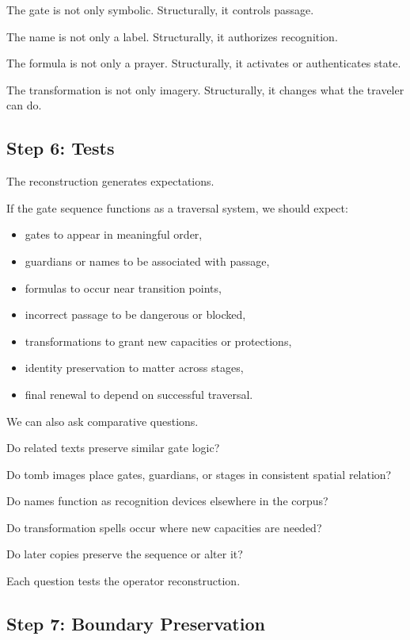 \documentclass[11pt]{book}
\begin{document}
The gate is not only symbolic. Structurally, it controls passage.

The name is not only a label. Structurally, it authorizes recognition.

The formula is not only a prayer. Structurally, it activates or authenticates state.

The transformation is not only imagery. Structurally, it changes what the traveler can do.

\subsection{Step 6: Tests}

The reconstruction generates expectations.

If the gate sequence functions as a traversal system, we should expect:

\begin{itemize}
    \item gates to appear in meaningful order,
    \item guardians or names to be associated with passage,
    \item formulas to occur near transition points,
    \item incorrect passage to be dangerous or blocked,
    \item transformations to grant new capacities or protections,
    \item identity preservation to matter across stages,
    \item final renewal to depend on successful traversal.
\end{itemize}

We can also ask comparative questions.

Do related texts preserve similar gate logic?

Do tomb images place gates, guardians, or stages in consistent spatial relation?

Do names function as recognition devices elsewhere in the corpus?

Do transformation spells occur where new capacities are needed?

Do later copies preserve the sequence or alter it?

Each question tests the operator reconstruction.

\subsection{Step 7: Boundary Preservation}
\end{document}
